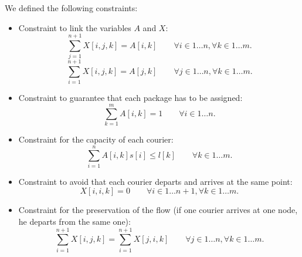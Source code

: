 We defined the following constraints:
\begin{itemize}
    \item Constraint to link the variables $A$ and $X$:
    \begin{equation}
        \sum_{j = 1}^{n+1} X[i,j,k] = A[i,k]  \qquad  \forall i \in 1 \dots n,\forall k \in 1 \dots m.
    \end{equation}
    \begin{equation}
        \sum_{i = 1}^{n+1} X[i,j,k] = A[j,k]  \qquad  \forall j \in 1 \dots n,\forall k \in 1 \dots m.
    \end{equation}

    \item Constraint to guarantee that each package has to be assigned:
    \begin{equation}
        \sum_{k = 1}^{m} A[i,k] = 1  \qquad \forall i \in 1 \dots n.
    \end{equation}

    \item Constraint for the capacity of each courier:
    \begin{equation}
        \sum_{i = 1}^{n} A[i,k] s[i] \leq l[k] \qquad \forall k \in 1 \dots m.
    \end{equation}

    \item Constraint to avoid that each courier departs and arrives at the same point:
    \begin{equation}
        X[i,i,k] = 0 \qquad \forall i \in 1 \dots n+1, \forall k \in 1 \dots m.
    \end{equation}


    \item Constraint for the preservation of the flow (if one courier arrives at one node, he departs from the same one):
    \begin{equation}
        \sum_{i = 1}^{n+1} X[i,j,k] = \sum_{i = 1}^{n+1} X[j,i,k] \qquad \forall j \in 1 \dots n, \forall k \in 1 \dots m.
    \end{equation}


\end{itemize}
